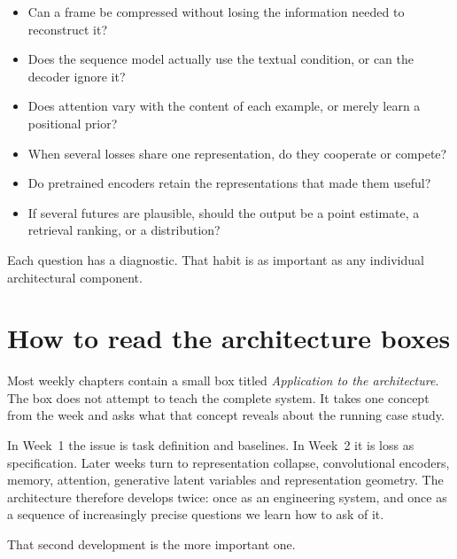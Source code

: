 \begin{itemize}[leftmargin=*]
  \item Can a frame be compressed without losing the information needed to reconstruct it?
  \item Does the sequence model actually use the textual condition, or can the decoder ignore it?
  \item Does attention vary with the content of each example, or merely learn a positional prior?
  \item When several losses share one representation, do they cooperate or compete?
  \item Do pretrained encoders retain the representations that made them useful?
  \item If several futures are plausible, should the output be a point estimate, a retrieval ranking, or a distribution?
\end{itemize}

Each question has a diagnostic. That habit is as important as any individual architectural component.

\section{How to read the architecture boxes}

Most weekly chapters contain a small box titled \emph{Application to the architecture}. The box does not attempt to teach the complete system. It takes one concept from the week and asks what that concept reveals about the running case study.

In Week~1 the issue is task definition and baselines. In Week~2 it is loss as specification. Later weeks turn to representation collapse, convolutional encoders, memory, attention, generative latent variables and representation geometry. The architecture therefore develops twice: once as an engineering system, and once as a sequence of increasingly precise questions we learn how to ask of it.

That second development is the more important one.
